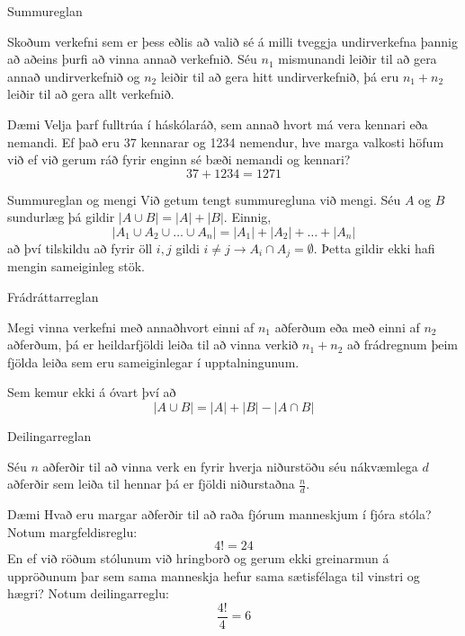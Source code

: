 \documentclass[handout]{beamer}
\begin{document}
\begin{frame}{Summureglan}
\begin{tcolorbox}[title=Summureglan]
Skoðum verkefni sem er þess eðlis að valið sé á milli tveggja undirverkefna þannig að aðeins þurfi að vinna annað verkefnið. Séu $n_1$ mismunandi leiðir til að gera annað undirverkefnið og $n_2$ leiðir til að gera hitt undirverkefnið, þá eru $n_1 + n_2$ leiðir til að gera allt verkefnið.
\end{tcolorbox}
\end{frame}

\begin{frame}{Dæmi}
Velja þarf fulltrúa í háskólaráð, sem annað hvort má vera kennari eða nemandi. Ef það eru 37 kennarar og 1234 nemendur, hve marga valkosti höfum við ef við gerum ráð fyrir enginn sé bæði nemandi og kennari?
\pause
\[
 37+1234 = 1271
\]
\end{frame}

\begin{frame}{Summureglan og mengi}
Við getum tengt summuregluna við mengi. Séu $A$ og $B$ sundurlæg þá gildir $|A \cup B| = |A| + |B|$. Einnig,
\[
 |A_1 \cup A_2 \cup \ldots \cup A_n| = |A_1| + |A_2| + \ldots + |A_n|
\]
að því tilskildu að fyrir öll $i,j$ gildi $i \neq j \to A_i \cap A_j = \emptyset$. Þetta gildir ekki hafi mengin sameiginleg stök.
\end{frame}

\begin{frame}{Frádráttarreglan}
\begin{tcolorbox}[title=Frádráttarreglan]
Megi vinna verkefni með annaðhvort einni af $n_1$ aðferðum eða með einni af $n_2$ aðferðum, þá er heildarfjöldi leiða til að vinna verkið $n_1 + n_2$ að frádregnum þeim fjölda leiða sem eru sameiginlegar í upptalningunum.
\end{tcolorbox}
Sem kemur ekki á óvart því að
\[
 |A \cup B| = |A| + |B| - |A \cap B|
\]

\end{frame}

\begin{frame}{Deilingarreglan}
\begin{tcolorbox}[title=Deilingarreglan]
Séu $n$ aðferðir til að vinna verk en fyrir hverja niðurstöðu séu nákvæmlega $d$ aðferðir sem leiða til hennar þá er fjöldi niðurstaðna $\frac{n}{d}$.
\end{tcolorbox}
\end{frame}

\begin{frame}{Dæmi}
Hvað eru margar aðferðir til að raða fjórum manneskjum í fjóra stóla? \pause Notum margfeldisreglu:
\[4! = 24\]
En ef við röðum stólunum við hringborð og gerum ekki greinarmun á uppröðunum þar sem sama manneskja hefur sama sætisfélaga til vinstri og hægri? \pause Notum deilingarreglu:
\[\frac{4!}{4} = 6\]
\end{frame}
\end{document}
